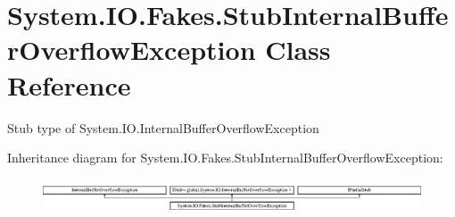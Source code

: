 \hypertarget{class_system_1_1_i_o_1_1_fakes_1_1_stub_internal_buffer_overflow_exception}{\section{System.\-I\-O.\-Fakes.\-Stub\-Internal\-Buffer\-Overflow\-Exception Class Reference}
\label{class_system_1_1_i_o_1_1_fakes_1_1_stub_internal_buffer_overflow_exception}
}


Stub type of System.\-I\-O.\-Internal\-Buffer\-Overflow\-Exception 


Inheritance diagram for System.\-I\-O.\-Fakes.\-Stub\-Internal\-Buffer\-Overflow\-Exception\-:\begin{figure}[H]
\begin{center}
\leavevmode
\includegraphics[height=1.051643cm]{class_system_1_1_i_o_1_1_fakes_1_1_stub_internal_buffer_overflow_exception}
\end{center}
\end{figure}
